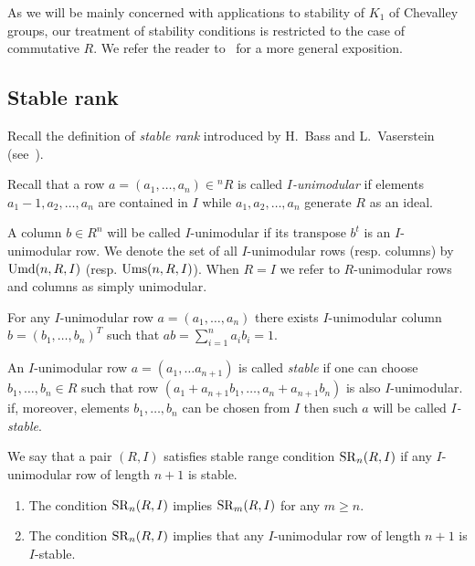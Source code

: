 As we will be mainly concerned with applications to stability of $K_1$ of Chevalley groups, our treatment of stability conditions is restricted to the case of commutative $R$. 
We refer the reader to~\cite{Ba64, Va69, Va71} for a more general exposition.

\subsection{Stable rank}
Recall the definition of {\it stable rank} introduced by H.~Bass and L.~Vaserstein (see~\cite{Ba64, Va69}).
\begin{dfn} Recall that a row $a=(a_1,\ldots, a_n)\in {}^n\!R$ is called {\it $I$-unimodular} if elements $a_1-1, a_2, \ldots, a_n$ are contained in $I$ while $a_1, a_2, \ldots, a_n$ generate $R$ as an ideal.\end{dfn}
A column $b \in R^n$ will be called $I$-unimodular if its transpose $b^t$ is an $I$- unimodular row. We denote the set of all $I$-unimodular rows (resp. columns) by $\operatorname{Umd}(n,R,I)$ (resp. $\operatorname{Ums}(n,R,I)$).
When $R=I$ we refer to $R$-unimodular rows and columns as simply unimodular.

\begin{lemma} \label{lemma:relstrlemma} For any $I$-unimodular row $a=(a_1, \ldots, a_n)$ there exists $I$-unimodular column $b=(b_1,\ldots, b_n)^T$ such that $ab = \sum\limits_{i=1}^n a_i b_i = 1$. \end{lemma}

\begin {dfn} An $I$-unimodular row $a=(a_1,\ldots a_{n+1})$ is called {\it stable} if one can choose $b_1,\ldots, b_n\in R$ such that
row $(a_1 + a_{n+1}b_1,\ldots, a_{n}+ a_{n+1}b_n)$ is also $I$-unimodular. if, moreover, elements $b_1,\ldots, b_n$ can be chosen from  $I$ then such $a$ will be called {\it $I$-stable}. \end{dfn} 

We say that a pair $(R, I)$ satisfies stable range condition $\operatorname{SR}_n(R, I)$ if any $I$-unimodular row of length $n+1$ is stable.
\begin{lemma}\label{lemma:relstrlemma2}\strut\begin{enumerate}\item The condition $\operatorname{SR}_n(R, I)$ implies $\operatorname{SR}_m(R,I)$ for any $m\geq n$.
\item The condition $\operatorname{SR}_n(R, I)$ implies that any $I$-unimodular row of length $n+1$ is $I$-stable.\end{enumerate}\end{lemma}

